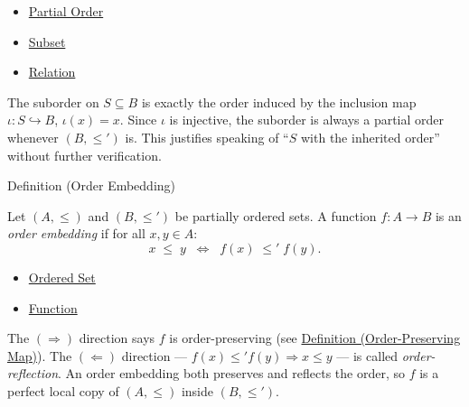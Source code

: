\begin{dependencies}
\begin{itemize}
  \item \hyperref[def:partial-order]{Partial Order}
  \item \hyperref[def:subset]{Subset}
  \item \hyperref[def:relation]{Relation}
\end{itemize}
\end{dependencies}

\begin{remark*}
The suborder on $S \subseteq B$ is exactly the order induced by the
inclusion map $\iota : S \hookrightarrow B$, $\iota(x) = x$. Since $\iota$
is injective, the suborder is always a partial order whenever $(B,\leq')$
is. This justifies speaking of ``$S$ with the inherited order'' without
further verification.
\end{remark*}


\begin{definitionbox}{Definition (Order Embedding)}
\begin{definition}\label{def:order-embedding}
Let $(A, \leq)$ and $(B, \leq')$ be partially ordered sets. A function
$f : A \to B$ is an \emph{order embedding} if for all $x, y \in A$:
\[
x \;\leq\; y
\;\;\Longleftrightarrow\;\;
f(x) \;\leq'\; f(y).
\]
\end{definition}
\end{definitionbox}

\begin{dependencies}
\begin{itemize}
  \item \hyperref[def:ordered-set]{Ordered Set}
  \item \hyperref[def:function]{Function}
\end{itemize}
\end{dependencies}

\begin{remark*}
The $(\Rightarrow)$ direction says $f$ is order-preserving
(see \hyperref[def:order-pres]{Definition (Order-Preserving Map)}). The
$(\Leftarrow)$ direction --- $f(x) \leq' f(y) \Rightarrow x \leq y$ ---
is called \emph{order-reflection}. An order embedding both preserves and
reflects the order, so $f$ is a perfect local copy of $(A,\leq)$ inside
$(B,\leq')$.
\end{remark*}

